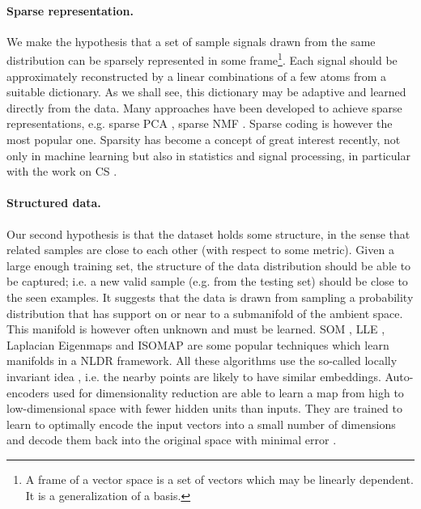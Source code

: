\paragraph{Sparse representation.}
We make the hypothesis that a set of sample signals drawn from the same distribution can be sparsely represented in some frame\footnote{A frame of a vector space is a set of vectors which may be linearly dependent. It is a generalization of a basis.}. Each signal should be approximately reconstructed by a linear combinations of a few atoms from a suitable dictionary. As we shall see, this dictionary may be adaptive and learned directly from the data. Many approaches have been developed to achieve sparse representations, e.g. sparse \gls{PCA} \cite{aspremont2007sparsePCA}, sparse NMF \cite{hoyer2004sparseNMF}. Sparse coding \cite{olshausen1996SparseV1, mairal2008sparseCoding} is however the most popular one. Sparsity has become a concept of great interest recently, not only in machine learning but also in statistics and signal processing, in particular with the work on \gls{CS} \cite{candes2005CS, donoho2006CS}.

\paragraph{Structured data.}
Our second hypothesis is that the dataset holds some structure, in the sense that related samples are close to each other (with respect to some metric). Given a large enough training set, the structure of the data distribution should be able to be captured; i.e. a new valid sample (e.g. from the testing set) should be close to the seen examples.
It suggests that the data is drawn from sampling a probability distribution that has support on or near to a submanifold of the ambient space.
This manifold is however often unknown and must be learned. \gls{SOM} \cite{kohonen1982SOM}, \gls{LLE} \cite{roweis2000LLE}, Laplacian Eigenmaps \cite{belkin2001laplacianEigenmaps} and ISOMAP \cite{tenenbaum2000isomap} are some popular techniques which learn manifolds in a \gls{NLDR} framework. All these algorithms use the so-called locally invariant idea \cite{lecun2006invariantMapping}, i.e. the nearby points are likely to have similar embeddings. Auto-encoders used for dimensionality reduction are able to learn a map from high to low-dimensional space with fewer hidden units than inputs. They are trained to learn to optimally encode the input vectors into a small number of dimensions and decode them back into the original space with minimal error \cite{bourlard1988autoencoder}.

